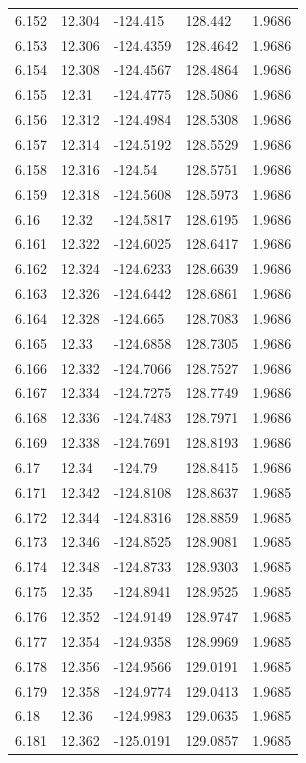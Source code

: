 \begin{tabular}{lllll}
6.152 & 12.304 & -124.415 & 128.442 & 1.9686 \\
6.153 & 12.306 & -124.4359 & 128.4642 & 1.9686 \\
6.154 & 12.308 & -124.4567 & 128.4864 & 1.9686 \\
6.155 & 12.31 & -124.4775 & 128.5086 & 1.9686 \\
6.156 & 12.312 & -124.4984 & 128.5308 & 1.9686 \\
6.157 & 12.314 & -124.5192 & 128.5529 & 1.9686 \\
6.158 & 12.316 & -124.54 & 128.5751 & 1.9686 \\
6.159 & 12.318 & -124.5608 & 128.5973 & 1.9686 \\
6.16 & 12.32 & -124.5817 & 128.6195 & 1.9686 \\
6.161 & 12.322 & -124.6025 & 128.6417 & 1.9686 \\
6.162 & 12.324 & -124.6233 & 128.6639 & 1.9686 \\
6.163 & 12.326 & -124.6442 & 128.6861 & 1.9686 \\
6.164 & 12.328 & -124.665 & 128.7083 & 1.9686 \\
6.165 & 12.33 & -124.6858 & 128.7305 & 1.9686 \\
6.166 & 12.332 & -124.7066 & 128.7527 & 1.9686 \\
6.167 & 12.334 & -124.7275 & 128.7749 & 1.9686 \\
6.168 & 12.336 & -124.7483 & 128.7971 & 1.9686 \\
6.169 & 12.338 & -124.7691 & 128.8193 & 1.9686 \\
6.17 & 12.34 & -124.79 & 128.8415 & 1.9686 \\
6.171 & 12.342 & -124.8108 & 128.8637 & 1.9685 \\
6.172 & 12.344 & -124.8316 & 128.8859 & 1.9685 \\
6.173 & 12.346 & -124.8525 & 128.9081 & 1.9685 \\
6.174 & 12.348 & -124.8733 & 128.9303 & 1.9685 \\
6.175 & 12.35 & -124.8941 & 128.9525 & 1.9685 \\
6.176 & 12.352 & -124.9149 & 128.9747 & 1.9685 \\
6.177 & 12.354 & -124.9358 & 128.9969 & 1.9685 \\
6.178 & 12.356 & -124.9566 & 129.0191 & 1.9685 \\
6.179 & 12.358 & -124.9774 & 129.0413 & 1.9685 \\
6.18 & 12.36 & -124.9983 & 129.0635 & 1.9685 \\
6.181 & 12.362 & -125.0191 & 129.0857 & 1.9685 \\

\end{tabular}
